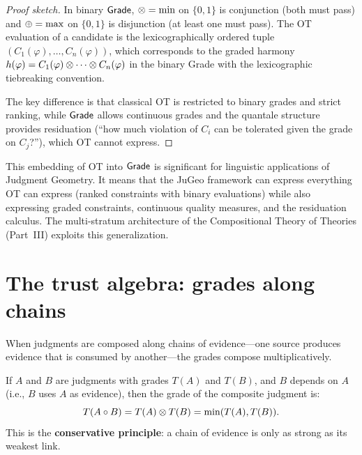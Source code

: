 \begin{proof}[Proof sketch]
In binary $\mathsf{Grade}$, $\otimes = \min$ on $\{0, 1\}$ is conjunction
(both must pass) and $\oplus = \max$ on $\{0, 1\}$ is disjunction
(at least one must pass).  The OT evaluation of a candidate is
the lexicographically ordered tuple $(C_1(\varphi), \ldots, C_n(\varphi))$,
which corresponds to the graded harmony $h(\varphi) =
C_1(\varphi) \otimes \cdots \otimes C_n(\varphi)$ in the binary Grade
with the lexicographic tiebreaking convention.

The key difference is that classical OT is restricted to binary grades
and strict ranking, while $\mathsf{Grade}$ allows continuous grades and the
quantale structure provides residuation (``how much violation of
$C_i$ can be tolerated given the grade on $C_j$?''), which OT
cannot express.
\end{proof}

\begin{remark}
\label{rem:ot-generalization}
This embedding of OT into $\mathsf{Grade}$ is significant for linguistic
applications of Judgment Geometry.  It means that the JuGeo framework
can express everything OT can express (ranked constraints with binary
evaluations) while also expressing graded constraints, continuous
quality measures, and the residuation calculus.  The multi-stratum
architecture of the Compositional Theory of Theories (Part~III)
exploits this generalization.
\end{remark}



\section{The trust algebra: grades along chains}
\label{sec:grade:trust}

When judgments are composed along chains of evidence---one source
produces evidence that is consumed by another---the grades compose
multiplicatively.

\begin{definition}
\label{def:trust-composition}
If $A$ and $B$ are judgments with grades $T(A)$ and $T(B)$, and $B$
depends on $A$ (i.e., $B$ uses $A$ as evidence), then the grade of
the composite judgment is:
\[
  T(A \circ B) = T(A) \otimes T(B) = \min(T(A), T(B)).
\]
This is the \textbf{conservative principle}: a chain of evidence is
only as strong as its weakest link.
\end{definition}

